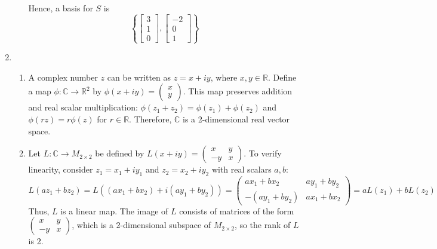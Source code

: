 \documentclass[12pt]{article}
\begin{document}
\begin{enumerate}
\begin{enumerate}
Hence, a basis for \( S \) is 
\[
\left\{
\begin{bmatrix}
3 \\
1 \\
0
\end{bmatrix},
\begin{bmatrix}
-2 \\
0 \\
1
\end{bmatrix}
\right\}
\]
\end{enumerate}
\item 
\begin{enumerate}
\item A complex number $z$ can be written as $z = x + iy$, where $x, y \in \mathbb{R}$. Define a map $\phi: \mathbb{C} \rightarrow \mathbb{R}^2$ by $\phi(x + iy) = \begin{pmatrix} x \\ y \end{pmatrix}$. This map preserves addition and real scalar multiplication: $\phi(z_1 + z_2) = \phi(z_1) + \phi(z_2)$ and $\phi(rz) = r\phi(z)$ for $r \in \mathbb{R}$. Therefore, $\mathbb{C}$ is a 2-dimensional real vector space.

\item Let $L: \mathbb{C} \rightarrow M_{2 \times 2}$ be defined by $L(x + iy) = \begin{pmatrix} x & y \\ -y & x \end{pmatrix}$. To verify linearity, consider $z_1 = x_1 + iy_1$ and $z_2 = x_2 + iy_2$ with real scalars $a, b$:
\[
L(az_1 + bz_2) = L((ax_1 + bx_2) + i(ay_1 + by_2)) = \begin{pmatrix} ax_1 + bx_2 & ay_1 + by_2 \\ -(ay_1 + by_2) & ax_1 + bx_2 \end{pmatrix} = aL(z_1) + bL(z_2)
\]
Thus, $L$ is a linear map. The image of $L$ consists of matrices of the form $\begin{pmatrix} x & y \\ -y & x \end{pmatrix}$, which is a 2-dimensional subspace of $M_{2 \times 2}$, so the rank of $L$ is 2.


\end{enumerate}
\end{enumerate}
\end{document}
